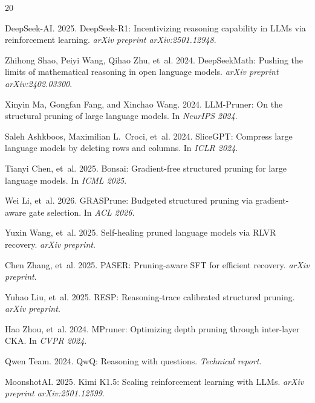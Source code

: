 \documentclass[11pt,a4paper]{article}
\begin{document}

\begin{thebibliography}{20}

DeepSeek-AI. 2025.
\newblock DeepSeek-R1: Incentivizing reasoning capability in LLMs via reinforcement learning.
\newblock \emph{arXiv preprint arXiv:2501.12948}.

Zhihong Shao, Peiyi Wang, Qihao Zhu, et~al. 2024.
\newblock DeepSeekMath: Pushing the limits of mathematical reasoning in open language models.
\newblock \emph{arXiv preprint arXiv:2402.03300}.

Xinyin Ma, Gongfan Fang, and Xinchao Wang. 2024.
\newblock LLM-Pruner: On the structural pruning of large language models.
\newblock In \emph{NeurIPS 2024}.

Saleh Ashkboos, Maximilian L.~Croci, et~al. 2024.
\newblock SliceGPT: Compress large language models by deleting rows and columns.
\newblock In \emph{ICLR 2024}.

Tianyi Chen, et~al. 2025.
\newblock Bonsai: Gradient-free structured pruning for large language models.
\newblock In \emph{ICML 2025}.

Wei Li, et~al. 2026.
\newblock GRASPrune: Budgeted structured pruning via gradient-aware gate selection.
\newblock In \emph{ACL 2026}.

Yuxin Wang, et~al. 2025.
\newblock Self-healing pruned language models via RLVR recovery.
\newblock \emph{arXiv preprint}.

Chen Zhang, et~al. 2025.
\newblock PASER: Pruning-aware SFT for efficient recovery.
\newblock \emph{arXiv preprint}.

Yuhao Liu, et~al. 2025.
\newblock RESP: Reasoning-trace calibrated structured pruning.
\newblock \emph{arXiv preprint}.

Hao Zhou, et~al. 2024.
\newblock MPruner: Optimizing depth pruning through inter-layer CKA.
\newblock In \emph{CVPR 2024}.

Qwen Team. 2024.
\newblock QwQ: Reasoning with questions.
\newblock \emph{Technical report}.

MoonshotAI. 2025.
\newblock Kimi K1.5: Scaling reinforcement learning with LLMs.
\newblock \emph{arXiv preprint arXiv:2501.12599}.

\end{thebibliography}
\end{document}
